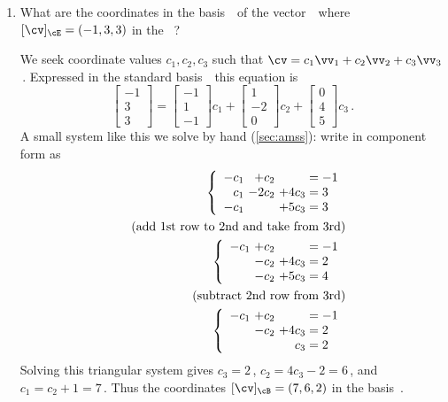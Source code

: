 \begin{example}
\begin{enumerate}
\item What are the coordinates in the basis~\cB\ of the vector~\cv\ where \([\cv]_\cE=(-1,3,3)\) in the ~\cE?
\begin{solution} 
We seek coordinate values \(c_1,c_2,c_3\) such that \(\cv=c_1\vv_1+c_2\vv_2+c_3\vv_3\)\,. 
Expressed in the standard basis~\cE\ this equation is
\begin{equation*}
\begin{bmatrix} -1\\3\\3 \end{bmatrix}=
\begin{bmatrix} -1\\1\\-1 \end{bmatrix}c_1+
\begin{bmatrix} 1\\-2\\0 \end{bmatrix}c_2+
\begin{bmatrix} 0\\4\\5 \end{bmatrix}c_3\,.
\end{equation*}
A small system like this we solve by hand (\cref{sec:amss}): write in component form as
\begin{eqnarray*}
&&\left\{\begin{array}{r@{\ }r@{\ }r@{{}={}}l}  
-c_1&+c_2&&-1 \\
c_1&-2c_2&+4c_3&3 \\
-c_1&&+5c_3&3
\end{array}\right.
\\&&(\text{add 1st row to 2nd and take from 3rd})
\\&&\left\{\begin{array}{r@{\ }r@{\ }r@{{}={}}l}  
-c_1&+c_2&&-1 \\
&-c_2&+4c_3&2 \\
&-c_2&+5c_3&4
\end{array}\right.
\\&&(\text{subtract 2nd row from 3rd})
\\&&\left\{\begin{array}{r@{\ }r@{\ }r@{{}={}}l}  
-c_1&+c_2&&-1 \\
&-c_2&+4c_3&2 \\
&&c_3&2
\end{array}\right.
\end{eqnarray*}
Solving this triangular system gives \(c_3=2\)\,, \(c_2=4c_3-2=6\)\,, and \(c_1=c_2+1=7\)\,.
Thus the coordinates \([\cv]_\cB=(7,6,2)\) in the basis~\cB.
\end{solution}



\end{enumerate}
\end{example}
